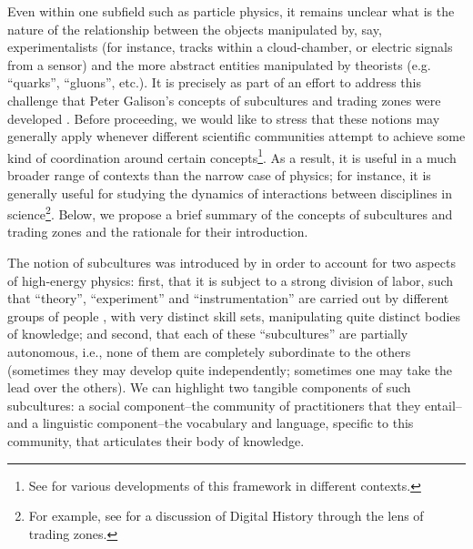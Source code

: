 \documentclass[smallextended]{svjour3}
\begin{document}
Even within one subfield such as particle physics, it remains unclear what is the nature of the relationship between the objects manipulated by, say, experimentalists (for instance, tracks within a cloud-chamber, or electric signals from a sensor) and the more abstract entities manipulated by theorists (e.g. ``quarks'', ``gluons'', etc.). It is precisely as part of an effort to address this challenge that Peter Galison's concepts of subcultures and trading zones were developed \citep{galison1987how,galison1997image}. Before proceeding, we would like to stress that these notions may generally apply whenever different scientific communities attempt to achieve some kind of coordination around certain concepts\footnote{See \citealt{gorman2010trading} for various developments of this framework in different contexts.}. As a result, it is useful in a much broader range of contexts than the narrow case of physics; for instance, it is generally useful for studying the dynamics of interactions between disciplines in science\footnote{For example, see \citealt{Kemman2021} for a discussion of Digital History through the lens of trading zones.}. Below, we propose a brief summary of the concepts of subcultures and trading zones and the rationale for their introduction.

The notion of subcultures was introduced by \citet{galison1987how,Galison1988} in order to account for two aspects of high-energy physics: first, that it is subject to a strong division of labor, such that ``theory'', ``experiment'' and ``instrumentation'' are carried out by different groups of people \citep[p.~138]{galison1987how}, with very distinct skill sets, manipulating quite distinct bodies of knowledge; and second, that each of these ``subcultures'' are partially autonomous, i.e., none of them are completely subordinate to the others (sometimes they may develop quite independently; sometimes one may take the lead over the others). We can highlight two tangible components of such subcultures: a social component--the community of practitioners that they entail--and a linguistic component--the vocabulary and language, specific to this community, that articulates their body of knowledge.
\end{document}
